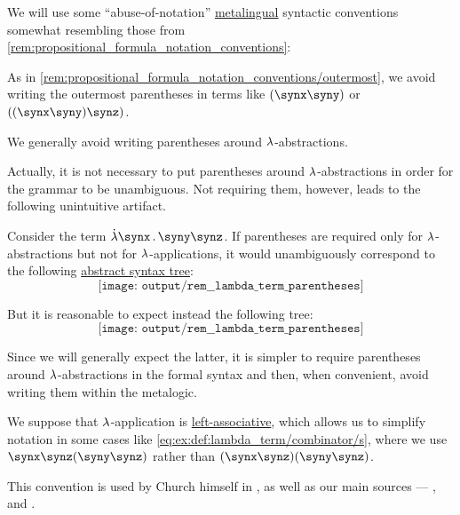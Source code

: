 \begin{remark}\label{rem:lambda_term_notation_conventions}
  We will use some \enquote{abuse-of-notation} \hyperref[con:metalogic]{metalingual} syntactic conventions somewhat resembling those from \cref{rem:propositional_formula_notation_conventions}:
  \begin{thmenum}
     As in \cref{rem:propositional_formula_notation_conventions/outermost}, we avoid writing the outermost parentheses in terms like \( (\synx \syny) \) or \( ((\synx \syny) \synz) \).

     We generally avoid writing parentheses around \( {\mathrm \lambda} \)-abstractions.

    Actually, it is not necessary to put parentheses around \( {\mathrm \lambda} \)-abstractions in order for the grammar to be unambiguous. Not requiring them, however, leads to the following unintuitive artifact.

    Consider the term \( \qabs \synx \syny \synz \). If parentheses are required only for \( {\mathrm \lambda} \)-abstractions but not for \( {\mathrm \lambda} \)-applications, it would unambiguously correspond to the following \hyperref[def:lambda_term_ast]{abstract syntax tree}:
    \begin{equation*}
      \texttt{[image: output/rem\_\_lambda\_term\_parentheses]}
    \end{equation*}

    But it is reasonable to expect instead the following tree:
    \begin{equation*}
      \texttt{[image: output/rem\_\_lambda\_term\_parentheses]}
    \end{equation*}

    Since we will generally expect the latter, it is simpler to require parentheses around \( {\mathrm \lambda} \)-abstractions in the formal syntax and then, when convenient, avoid writing them within the metalogic.

     We suppose that \( {\mathrm \lambda} \)-application is \hyperref[rem:binary_operation_syntax_trees/associativity]{left-associative}, which allows us to simplify notation in some cases like \eqref{eq:ex:def:lambda_term/combinator/s}, where we use \( \synx \synz (\syny \synz) \) rather than \( (\synx \synz)(\syny \synz) \).

    This convention is used by Church himself in , as well as our main sources --- ,  and .
  \end{thmenum}
\end{remark}

